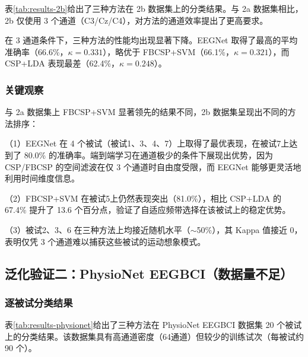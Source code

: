 表\ref{tab:results-2b}给出了三种方法在 2b 数据集上的分类结果。与 2a 数据集相比，2b 仅使用 3 个通道（C3/Cz/C4），对方法的通道效率提出了更高要求。

\begin{table}[htbp]
	\centering
	
\end{table}

在 3 通道条件下，三种方法的性能均出现显著下降。EEGNet 取得了最高的平均准确率（66.6\%，$\kappa = 0.331$），略优于 FBCSP+SVM（66.1\%，$\kappa = 0.321$），而 CSP+LDA 表现最差（62.4\%，$\kappa = 0.248$）。

\subsubsection{关键观察}

与 2a 数据集上 FBCSP+SVM 显著领先的结果不同，2b 数据集呈现出不同的方法排序：

（1）EEGNet 在 4 个被试（被试1、3、4、7）上取得了最优表现，在被试7上达到了 80.0\% 的准确率。端到端学习在通道极少的条件下展现出优势，因为 CSP/FBCSP 的空间滤波在仅 3 个通道时自由度受限，而 EEGNet 能够更灵活地利用时间维度信息。

（2）FBCSP+SVM 在被试5上仍然表现突出（81.0\%），相比 CSP+LDA 的 67.4\% 提升了 13.6 个百分点，验证了自适应频带选择在该被试上的稳定优势。

（3）被试2、3、6 在三种方法上均接近随机水平（$\sim$50\%），其 Kappa 值接近 0，表明仅凭 3 个通道难以捕获这些被试的运动想象模式。

\subsection{泛化验证二：PhysioNet EEGBCI（数据量不足）}

\subsubsection{逐被试分类结果}

表\ref{tab:results-physionet}给出了三种方法在 PhysioNet EEGBCI 数据集 20 个被试上的分类结果。该数据集具有高通道密度（64通道）但较少的训练试次（每被试约 90 个）。

\begin{table}[htbp]
	\centering
	\footnotesize
	
\end{table}

